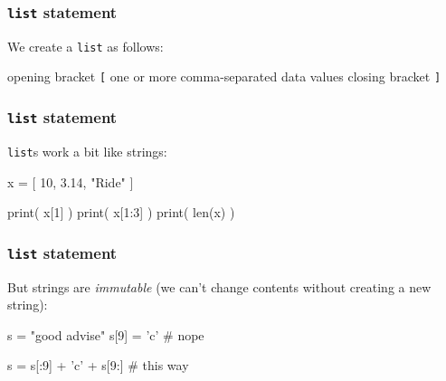 \documentclass[11pt]{beamer}
\begin{document}
\begin{frame}[fragile]
  \frametitle{\texttt{list} statement}
  \Enlarge

  \begin{itemize}
  \myitem  We create a \texttt{list} as follows:
    \begin{itemize}
    \mysubitem  opening bracket \texttt{[}
    \mysubitem  one or more comma-separated data values
    \mysubitem  closing bracket \texttt{]}
    \end{itemize}
  \end{itemize}
\end{frame}

\begin{frame}[fragile]
  \frametitle{\texttt{list} statement}
  \Enlarge

  \begin{itemize}
  \myitem  \texttt{list}s work a bit like strings:
    \begin{semiverbatim}
x = [ 10, 3.14, "Ride" ]

print( x[1] )
print( x[1:3] )
print( len(x) )
    \end{semiverbatim}
  \end{itemize}
\end{frame}

\begin{frame}[fragile]
  \frametitle{\texttt{list} statement}
  \Enlarge

  \begin{itemize}
  \myitem  But strings are \emph{immutable} (we can't change contents without creating a new string): %
  \end{itemize}
  \begin{semiverbatim}
s = "good advise"
s[9] = 'c'                 # nope

s = s[:9] + 'c' + s[9:]    # this way
  \end{semiverbatim}
\end{frame}
\end{document}
